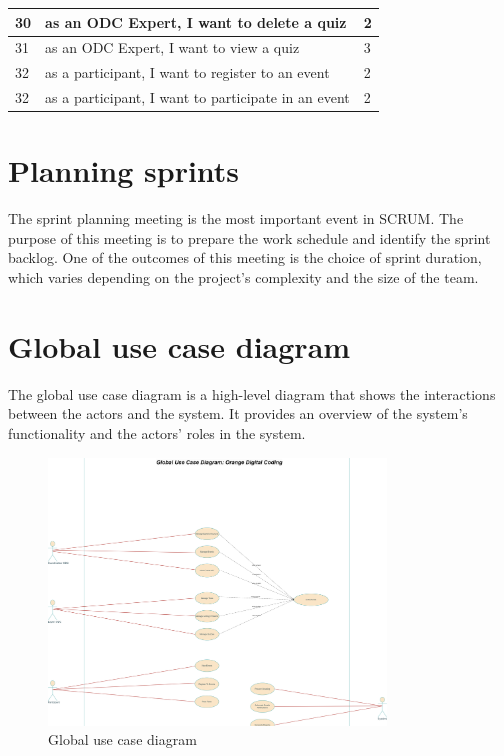 \begin{longtable}{|l|l|l|}
      30                     & as an ODC Expert, I want to delete a quiz                & 2                 \\ \hline
      31                     & as an ODC Expert, I want to view a quiz                  & 3                 \\ \hline
      32                     & as a participant, I want to register to an event         & 2                 \\ \hline
      32                     & as a participant, I want to participate in an event      & 2                 \\ \hline
\end{longtable}


\section{Planning sprints}
The sprint planning meeting is the most important event in SCRUM. The purpose
of this meeting is to prepare the work schedule and identify the sprint
backlog. One of the outcomes of this meeting is the choice of sprint duration,
which varies depending on the project's complexity and the size of the team.


\section{Global use case diagram}
The global use case diagram is a high-level diagram that shows the interactions
between the actors and the system. It provides an overview of the system's
functionality and the actors' roles in the system.
\begin{figure}[h!]
      \centering

      \includegraphics[width=0.8\textwidth]{images/useCaseGlobal.png}
      \caption{Global use case diagram}
      \label{fig:use_case_diagram}
\end{figure}


